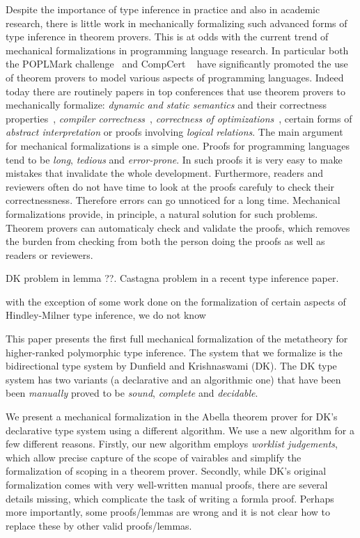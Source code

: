 Despite the importance of type inference in practice and also in
academic research, there is little work in mechanically formalizing
such advanced forms of type inference in theorem provers. This is at
odds with the current trend of mechanical formalizations in
programming language research. In particular both the POPLMark
challenge~\cite{} and CompCert ~\cite{} have significantly promoted
the use of theorem provers to model various aspects of programming
languages. Indeed today there are routinely papers in top conferences
that use theorem provers to mechanically formalize: \emph{dynamic and
  static semantics} and their correctness properties~\cite{},
\emph{compiler correctness}~\cite{}, \emph{correctness of
  optimizations}~\cite{}, certain forms of \emph{abstract
  interpretation} or proofs involving \emph{logical relations}. The
main argument for mechanical formalizations is a simple one. Proofs
for programming languages tend to be \emph{long}, \emph{tedious} and
\emph{error-prone}. In such proofs it is very easy to make mistakes
that invalidate the whole development. Furthermore, readers and
reviewers often do not have time to look at the proofs carefuly to
check their correctnessness. Therefore errors can go unnoticed for a
long time.  Mechanical formalizations provide, in principle, a natural
solution for such problems. Theorem provers can automaticaly check and
validate the proofs, which removes the burden from checking from both
the person doing the proofs as well as readers or reviewers.

DK problem in lemma ??. Castagna problem in a recent type inference paper.

with the exception of some work
done on the formalization of 
certain aspects of Hindley-Milner type inference, we do not know 

This paper presents the first full mechanical formalization of the metatheory for
higher-ranked polymorphic type inference. The system that we formalize
is the bidirectional type system by Dunfield and
Krishnaswami (DK). The DK type system has two variants (a declarative
and an algorithmic one) that have been been \emph{manually} proved to be
\emph{sound}, \emph{complete} and \emph{decidable}. 

We present 
a mechanical formalization in the Abella theorem prover 
for DK's declarative type system using a different algorithm. We use a
new algorithm for a few different reasons. Firstly, our new algorithm
employs \emph{worklist judgements}, which allow precise capture of the
scope of vairables and simplify the formalization of scoping in a
theorem prover. Secondly, while DK's original formalization comes with very
well-written manual proofs, there are several details missing,
which complicate the task of writing a formla proof. 
Perhaps more importantly, some proofs/lemmas are wrong and it is
not clear how to replace these by other valid proofs/lemmas. 

